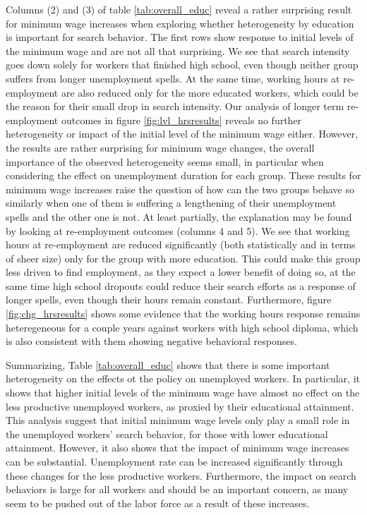 \documentclass{article}
\begin{document}
Columns (2) and (3) of table \ref{tab:overall_educ} reveal a rather surprising result for minimum wage increases when exploring whether heterogeneity by education is important for search behavior. The first rows show response to initial levels of the minimum wage and are not all that surprising. We see that search intensity goes down solely for workers that finished high school, even though neither group suffers from longer unemployment spells. At the same time, working hours at re-employment are also reduced only for the more educated workers, which could be the reason for their small drop in search intensity. Our analysis of longer term re-employment outcomes in figure \ref{fig:lvl_hrsresults} reveals no further heterogeneity or impact of the initial level of the minimum wage either. However, the results are rather surprising for minimum wage changes, the overall importance of the observed heterogeneity seems small, in particular when considering the effect on unemployment duration for each group. These results for minimum wage increases raise the question of how can the two groups behave so similarly when one of them is suffering a lengthening of their unemployment spells and the other one is not. At least partially, the explanation may be found by looking at re-employment outcomes (columns 4 and 5). We see that working hours at re-employment are reduced significantly (both statistically and in terms of sheer size) only for the group with more education. This could make this group less driven to find employment, as they expect a lower benefit of doing so, at the same time high school dropouts could reduce their search efforts as a response of longer spells, even though their hours remain constant. Furthermore, figure \ref{fig:chg_hrsresults} shows some evidence that the working hours response remains heteregeneous for a couple years against workers with high school diploma, which is also consistent with them showing negative behavioral responses.

Summarizing, Table \ref{tab:overall_educ} shows that there is some important heterogeneity on the effects ot the policy on unemployed workers. In particular, it shows that higher initial levels of the minimum wage have almost no effect on the less productive unemployed workers, as proxied by their educational attainment. This analysis suggest that initial minimum wage levels only play a small role in the unemployed workers' search behavior, for those with lower educational attainment. However, it also shows that the impact of minimum wage increases can be substantial. Unemployment rate can be increased significantly through these changes for the less productive workers. Furthermore, the impact on search behaviors is large for all workers and should be an important concern, as many seem to be pushed out of the labor force as a result of these increases.
\end{document}

